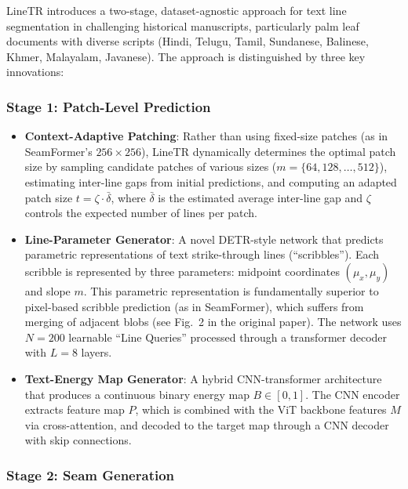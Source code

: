 \documentclass[11pt, a4paper]{article}
\begin{document}
LineTR introduces a two-stage, dataset-agnostic approach for text line segmentation in challenging historical manuscripts, particularly palm leaf documents with diverse scripts (Hindi, Telugu, Tamil, Sundanese, Balinese, Khmer, Malayalam, Javanese). The approach is distinguished by three key innovations:

\subsubsection{Stage 1: Patch-Level Prediction}

\begin{itemize}[leftmargin=1.5em]
    \item \textbf{Context-Adaptive Patching}: Rather than using fixed-size patches (as in SeamFormer's $256\times256$), LineTR dynamically determines the optimal patch size by sampling candidate patches of various sizes ($m = \{64, 128, \ldots, 512\}$), estimating inter-line gaps from initial predictions, and computing an adapted patch size $t = \zeta \cdot \bar{\delta}$, where $\bar{\delta}$ is the estimated average inter-line gap and $\zeta$ controls the expected number of lines per patch.
    
    \item \textbf{Line-Parameter Generator}: A novel DETR-style network that predicts parametric representations of text strike-through lines (``scribbles''). Each scribble is represented by three parameters: midpoint coordinates $(\mu_x, \mu_y)$ and slope $m$. This parametric representation is fundamentally superior to pixel-based scribble prediction (as in SeamFormer), which suffers from merging of adjacent blobs (see Fig.~2 in the original paper). The network uses $N = 200$ learnable ``Line Queries'' processed through a transformer decoder with $L = 8$ layers.
    
    \item \textbf{Text-Energy Map Generator}: A hybrid CNN-transformer architecture that produces a continuous binary energy map $B \in [0, 1]$. The CNN encoder extracts feature map $P$, which is combined with the ViT backbone features $M$ via cross-attention, and decoded to the target map through a CNN decoder with skip connections.
\end{itemize}

\subsubsection{Stage 2: Seam Generation}
\end{document}
